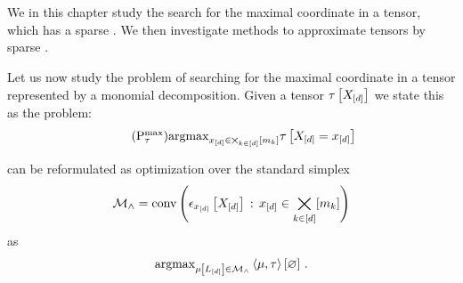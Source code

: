 \chapter{\chatextapproximation}\label{cha:approximation}

We in this chapter study the search for the maximal coordinate in a tensor, which has a sparse \basplusDecomposition{}.
We then investigate methods to approximate tensors by sparse \basplusDecomposition{}.



Let us now study the problem of searching for the maximal coordinate in a tensor represented by a monomial decomposition.
Given a tensor $\tau\left[X_{[d]}\right]$ we state this as the problem:
\begin{align}
    \label{prob:maxCoordinate}\tag{$\probtagtypeinst{\maximizationsymbol}{\hypercore}$}
    \argmax_{\shortcatindices\in\facstates} \hypercoreat{\indexedshortcatvariables}
\end{align}

 can be reformulated as optimization over the standard simplex
\begin{align*}
    \mathcal{M}_{\land} = \mathrm{conv}\left(\epsilon_{x_{[d]}}\left[X_{[d]}\right] \,:\, x_{[d]}\in\bigtimes_{k\in[d]}[m_{k}]\right)
\end{align*}
as
\begin{align*}
    \mathrm{argmax}_{\mu\left[L_{[d]}\right]\in\mathcal{M}_{\land}} \left\langle \mu,\tau\right\rangle \left[ \varnothing \right] \, .
\end{align*}

